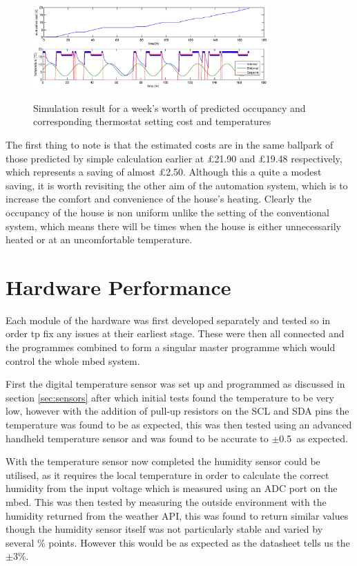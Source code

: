 \documentclass[10.5pt,a4paper,twoside]{report}   %
\begin{document}
\begin{figure}[h!]
  \vspace{-10pt}
  \caption{Simulation result for a week's worth of predicted occupancy and corresponding thermostat setting  cost and temperatures}
  \centering
    \includegraphics[width=0.8\textwidth]{images/thermal_m_autohome.eps}
\label{fig:autohsimu}
  \vspace{-10pt}
\end{figure}

The first thing to note is that the estimated costs are in the same ballpark of those predicted by simple calculation earlier at \pounds 21.90 and \pounds 19.48 respectively, which represents a saving of almost \pounds 2.50. Although this a quite a modest saving, it is worth revisiting the other aim of the automation system, which is to increase the comfort and convenience of the house's heating. Clearly the occupancy of the house is non uniform unlike the setting of the conventional system, which means there will be times when the house is either unnecessarily heated or at an uncomfortable temperature. 
\section{Hardware Performance}
Each module of the hardware was first developed separately and tested so in order tp fix any issues at their earliest stage. These were then all connected and the programmes combined to form a singular master programme which would control the whole mbed system.

First the digital temperature sensor was set up and programmed as discussed in section \ref{sec:sensors} after which initial tests found the temperature to be very low, however with the addition of pull-up resistors on the SCL and SDA pins the temperature was found to be as expected, this was then tested using an advanced handheld temperature sensor and was found to be accurate to $\pm$0.5\celsius\ as expected.

With the temperature sensor now completed the humidity sensor could be utilised, as it requires the local temperature in order to calculate the correct humidity from the input voltage which is measured using an ADC port on the mbed. This was then tested by measuring the outside environment with the humidity returned from the weather API, this was found to return similar values though the humidity sensor itself was not particularly stable and varied by several \% points. However this would be as expected as the datasheet tells us the $\pm$3\%.
\end{document}
